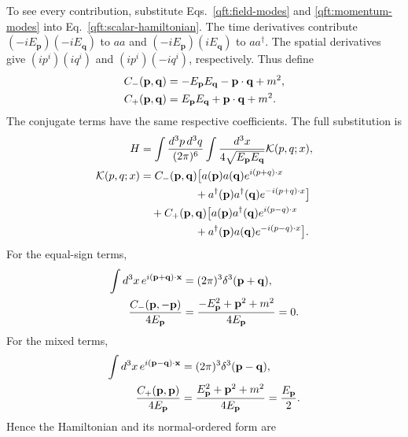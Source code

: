 To see every contribution, substitute Eqs.~\eqref{qft:field-modes} and
\eqref{qft:momentum-modes} into Eq.~\eqref{qft:scalar-hamiltonian}.
The time derivatives contribute $(-iE_{\mathbf p})(-iE_{\mathbf q})$
to $aa$ and $(-iE_{\mathbf p})(iE_{\mathbf q})$ to
$aa^\dagger$. The spatial derivatives give
$(ip^i)(iq^i)$ and $(ip^i)(-iq^i)$, respectively. Thus define
\begin{align}
 C_-(\mathbf p,\mathbf q)
 &=-E_{\mathbf p}E_{\mathbf q}-\mathbf p\cdot\mathbf q+m^2,
 \notag\\
 C_+(\mathbf p,\mathbf q)
 &= E_{\mathbf p}E_{\mathbf q}+\mathbf p\cdot\mathbf q+m^2.
 \label{qft:hamiltonian-kernel-coefficients}
\end{align}
The conjugate terms have the same respective coefficients. The full
substitution is
\begin{align}
 H&=\int\frac{d^3p\,d^3q}{(2\pi)^6}
 \int\frac{d^3x}{4\sqrt{E_{\mathbf p}E_{\mathbf q}}}
 \mathcal K(p,q;x),\notag\\
 \mathcal K(p,q;x)
 &=C_-(\mathbf p,\mathbf q)\big[
 a(\mathbf p)a(\mathbf q)e^{i(p+q)\cdot x}\notag\\
 &\hspace{5em}+a^\dagger(\mathbf p)a^\dagger(\mathbf q)e^{-i(p+q)\cdot x}
 \big]\notag\\
 &\quad+C_+(\mathbf p,\mathbf q)\big[
 a(\mathbf p)a^\dagger(\mathbf q)e^{i(p-q)\cdot x}\notag\\
 &\hspace{5em}+a^\dagger(\mathbf p)a(\mathbf q)e^{-i(p-q)\cdot x}
 \big].\label{qft:hamiltonian-full-kernel}
\end{align}
For the equal-sign terms,
\begin{align}
 \int d^3x\,e^{i(\mathbf p+\mathbf q)\cdot\mathbf x}
 &=(2\pi)^3\delta^3(\mathbf p+\mathbf q),\notag\\
 \frac{C_-(\mathbf p,-\mathbf p)}{4E_{\mathbf p}}
 &=\frac{-E_{\mathbf p}^2+\mathbf p^2+m^2}{4E_{\mathbf p}}=0.
 \label{qft:hamiltonian-pair-cancellation}
\end{align}
For the mixed terms,
\begin{align}
 \int d^3x\,e^{i(\mathbf p-\mathbf q)\cdot\mathbf x}
 &=(2\pi)^3\delta^3(\mathbf p-\mathbf q),\notag\\
 \frac{C_+(\mathbf p,\mathbf p)}{4E_{\mathbf p}}
 &=\frac{E_{\mathbf p}^2+\mathbf p^2+m^2}{4E_{\mathbf p}}
 =\frac{E_{\mathbf p}}2.
 \label{qft:hamiltonian-mixed-coefficient}
\end{align}
Hence the Hamiltonian and its normal-ordered form are
